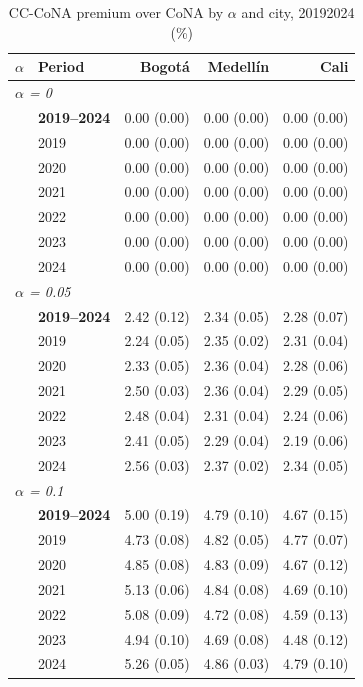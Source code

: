 \begin{table}[htbp]
\centering\small
\caption{CC-CoNA premium over CoNA by $\alpha$ and city, 2019\textendash{}2024 (\%)}
\label{tab:ccona_premium}
\begin{tabular}{llrrr}
\toprule
\multicolumn{1}{c}{$\alpha$} & Period & Bogot\'{a} & Medell\'{i}n & Cali \\
\midrule
\multicolumn{5}{l}{\textit{$\alpha$ = 0}} \\
 & \textbf{2019–2024} & 0.00 (0.00) & 0.00 (0.00) & 0.00 (0.00) \\
 & 2019 & 0.00 (0.00) & 0.00 (0.00) & 0.00 (0.00) \\
 & 2020 & 0.00 (0.00) & 0.00 (0.00) & 0.00 (0.00) \\
 & 2021 & 0.00 (0.00) & 0.00 (0.00) & 0.00 (0.00) \\
 & 2022 & 0.00 (0.00) & 0.00 (0.00) & 0.00 (0.00) \\
 & 2023 & 0.00 (0.00) & 0.00 (0.00) & 0.00 (0.00) \\
 & 2024 & 0.00 (0.00) & 0.00 (0.00) & 0.00 (0.00) \\
\midrule
\multicolumn{5}{l}{\textit{$\alpha$ = 0.05}} \\
 & \textbf{2019–2024} & 2.42 (0.12) & 2.34 (0.05) & 2.28 (0.07) \\
 & 2019 & 2.24 (0.05) & 2.35 (0.02) & 2.31 (0.04) \\
 & 2020 & 2.33 (0.05) & 2.36 (0.04) & 2.28 (0.06) \\
 & 2021 & 2.50 (0.03) & 2.36 (0.04) & 2.29 (0.05) \\
 & 2022 & 2.48 (0.04) & 2.31 (0.04) & 2.24 (0.06) \\
 & 2023 & 2.41 (0.05) & 2.29 (0.04) & 2.19 (0.06) \\
 & 2024 & 2.56 (0.03) & 2.37 (0.02) & 2.34 (0.05) \\
\midrule
\multicolumn{5}{l}{\textit{$\alpha$ = 0.1}} \\
 & \textbf{2019–2024} & 5.00 (0.19) & 4.79 (0.10) & 4.67 (0.15) \\
 & 2019 & 4.73 (0.08) & 4.82 (0.05) & 4.77 (0.07) \\
 & 2020 & 4.85 (0.08) & 4.83 (0.09) & 4.67 (0.12) \\
 & 2021 & 5.13 (0.06) & 4.84 (0.08) & 4.69 (0.10) \\
 & 2022 & 5.08 (0.09) & 4.72 (0.08) & 4.59 (0.13) \\
 & 2023 & 4.94 (0.10) & 4.69 (0.08) & 4.48 (0.12) \\
 & 2024 & 5.26 (0.05) & 4.86 (0.03) & 4.79 (0.10) \\

\end{tabular}
\end{table}
